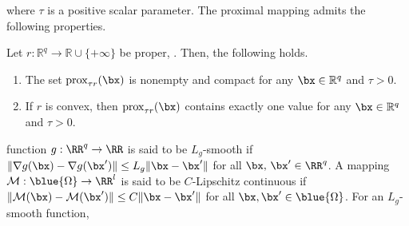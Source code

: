 where $\tau$ is a positive scalar parameter. The proximal mapping admits the following
properties.
\begin{proposition}\label{prop:rockafellar}
\textnormal{\cite{Rockafellar1998VariationalA}}
    Let $r : \mathbb{R}^{q}\rightarrow \mathbb{R}\cup \{+\infty\}$ be proper, . Then, the following holds.
    \begin{enumerate}[label=(\roman*)]
        \item The set $\operatorname{prox}_{\tau r}(\bx)$ is nonempty and compact
            for any $\bx \in \mathbb{R}^{q}$ and $\tau > 0$.

        \item If $r$ is convex, then $\operatorname{prox}_{\tau r}(\bx)$
            contains exactly one value for any $\bx \in \mathbb{R}^{q}$ and
            $\tau > 0$.
    \end{enumerate}
\end{proposition}

 function $g: \RR^q \rightarrow \RR$ is said to be $L_g$-smooth if $\| \nabla g(\bx) - \nabla g(\bx') \| \leq L_g \| \bx - \bx'\|$ for all $\bx,\, \bx' \in \RR^q$.
A mapping $\mathcal{M} : \blue{\Omega} \to \RR^l$ is said to be $C$-Lipschitz continuous if $\|\mathcal{M}(\bx) - \mathcal{M}(\bx')\| \leq C\|\bx - \bx'\|$ for all $\bx, \bx' \in \blue{\Omega}$. For an $L_g$-smooth function, 